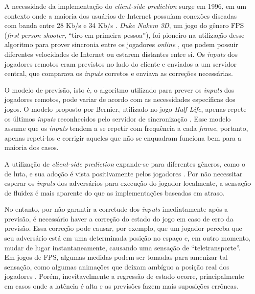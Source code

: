 A necessidade da implementação do \textit{client-side prediction} surge em 1996, em um contexto onde a maioria dos usuários de Internet possuíam conexões discadas com banda entre 28 Kb/s e 34 Kb/s \cite{broadband}. \textit{Duke Nukem 3D}, um jogo do gênero FPS (\textit{first-person shooter}, ``tiro em primeira pessoa''), foi pioneiro na utilização desse algoritmo para prover sincronia entre os jogadores \textit{online} \cite{duke_nukem}, que podem possuir diferentes velocidades de Internet ou estarem distantes entre si. Os \textit{inputs} dos jogadores remotos eram previstos no lado do cliente e enviados a um servidor central, que comparava os \textit{inputs} corretos e enviava as correções necessárias.

O modelo de previsão, isto é, o algoritmo utilizado para prever os \textit{inputs} dos jogadores remotos, pode variar de acordo com as necessidades específicas dos jogos. O modelo proposto por Bernier, utilizado no jogo \textit{Half-Life}, apenas repete os últimos \textit{inputs} reconhecidos pelo servidor de sincronização \cite{client-side-prediction}. Esse modelo assume que os \textit{inputs} tendem a se repetir com frequência a cada \textit{frame}, portanto, apenas repeti-los e corrigir aqueles que não se enquadram funciona bem para a maioria dos casos.

A utilização de \textit{client-side prediction} expande-se para diferentes gêneros, como o de luta, e sua adoção é vista positivamente pelos jogadores \cite{rollback_success}. Por não necessitar esperar os \textit{inputs} dos adversários para execução do jogador localmente, a sensação de fluidez é mais aparente do que as implementações baseadas em atraso.

No entanto, por não garantir a corretude dos \textit{inputs} imediatamente após a previsão, é necessário haver a correção do estado do jogo em caso de erro da previsão. Essa correção pode causar, por exemplo, que um jogador perceba que seu adversário está em uma determinada posição no espaço e, em outro momento, mudar de lugar instantaneamente, causando uma sensação de ``teletransporte''. Em jogos de FPS, algumas medidas podem ser tomadas para amenizar tal sensação, como algumas animações que deixam ambíguo a posição real dos jogadores \cite{ronnie}. Porém, inevitavelmente a regressão de estado ocorre, principalmente em casos onde a latência é alta e as previsões fazem mais suposições errôneas.